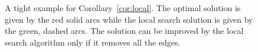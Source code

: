 \begin{figure}
\begin{center}
\caption[Bounded Capacity Local Search Algorithm - A Tight Example]{A tight example for Corollary~\ref{cor:local}. 
The optimal solution is given by the red solid arcs while the local
search solution is given by the green, dashed arcs.  The solution can
be improved by the local search algorithm only if it removes all the
edges.}
\label{fig:local search tight}
\end{center}
\end{figure}


